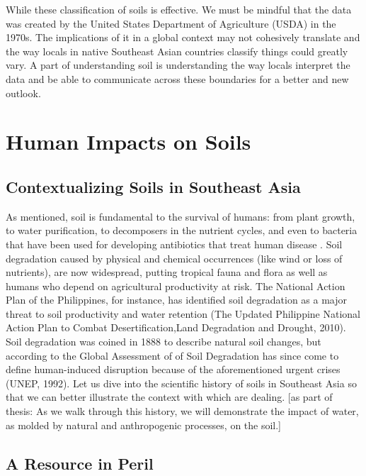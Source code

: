 While these classification of soils is effective. We must be mindful that the data was created by the United States Department of Agriculture (USDA) in the 1970s. The implications of it in a global context may not cohesively translate and the way locals in native Southeast Asian countries classify things could greatly vary. A part of understanding soil is understanding the way locals interpret the data and be able to communicate across these boundaries for a better and new outlook.





\section{Human Impacts on Soils}

\subsection{Contextualizing Soils in Southeast Asia}

As mentioned, soil is fundamental to the survival of humans: from plant growth, to water purification, to decomposers in the nutrient cycles, and even to bacteria that have been used for developing antibiotics that treat human disease \citep{asio2006morphology}. Soil degradation caused by physical and chemical occurrences (like wind or loss of nutrients), are now widespread, putting tropical fauna and flora as well as humans who depend on agricultural productivity at risk. The National Action Plan of the Philippines, for instance, has identified soil degradation as a major threat to soil productivity and water retention (The Updated Philippine National Action Plan to Combat Desertification,Land Degradation and Drought, 2010). Soil degradation was coined in 1888 to describe natural soil changes, but according to the Global Assessment of of Soil Degradation has since come to define human-induced disruption because of the aforementioned urgent crises (UNEP, 1992). Let us dive into the scientific history of soils in Southeast Asia so that we can better illustrate the context with which are dealing. [as part of thesis: As we walk through this history, we will demonstrate the impact of water, as molded by natural and anthropogenic processes, on the soil.]

\subsection{A Resource in Peril}

